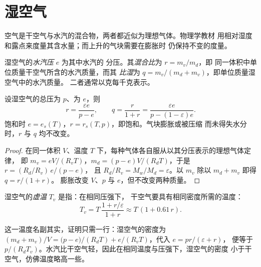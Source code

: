 \section{湿空气}\label{sec:b2:atmospheric-thermodynamics:moist-air}

空气是干空气与水汽的混合物，两者都近似为理想气体。物理学教材
用相对湿度和露点来度量其含水量；而上升的气块需要在膨胀时
仍保持不变的度量。

\begin{definition}\label{def:b2:atmospheric-thermodynamics:moist-air}
湿空气的\emph{水汽压} $e$ 为其中水汽的
分压。其\emph{混合比}为 $r = m_v/m_d$，即
同一体积中单位质量干空气所含的水汽质量，而其
\emph{比湿}为 $q = m_v/(m_d + m_v)$，即单位质量湿空气中的水汽质量。
二者通常以克每千克表示。
\end{definition}

\begin{proposition}[湿度变量]\label{prop:b2:atmospheric-thermodynamics:humidity}
设湿空气的总压为 $p$、为 $e$，则
\[
  r = \frac{\varepsilon e}{p - e}, \qquad q = \frac{r}{1 + r} = \frac{\varepsilon e}{p - (1 -
  \varepsilon)e} .
\]
饱和时 $e = e_s(T)$，$r = r_s(T, p)$，即饱和。气块膨胀或被压缩
而未得失水分时，$r$ 与 $q$ 均不改变。
\end{proposition}

\begin{proof}
在同一体积 $V$、温度 $T$ 下，每种气体各自服从以其分压表示的理想气体定律，
即 $m_v = eV/(R_vT)$，$m_d = (p - e)V/(R_dT)$，于是 $r = (R_d/R_v)\,e/(p - e)$，
且 $R_d/R_v = M_w/M_d = \varepsilon$。以 $m_v$ 除以 $m_d + m_v$ 即得 $q = r/(1 + r)$。
膨胀改变 $V$、$p$ 与 $e$，但不改变两种质量。
\end{proof}

\begin{definition}[虚温]\label{def:b2:atmospheric-thermodynamics:virtual}
湿空气的\emph{虚温} $T_v$ 是指：在相同压强下，
干空气要具有相同密度所需的温度：
\[
  T_v = T\,\frac{1 + r/\varepsilon}{1 + r} \approx T\,(1 + 0.61\,r) .
\]
\end{definition}

这一温度名副其实，证明只需一行：湿空气的密度为
$(m_d + m_v)/V = \bigl(p - e\bigr)/(R_dT) + e/(R_vT)$，代入 $e = pr/(\varepsilon + r)$，
便等于 $p/(R_dT_v)$。水汽比干空气轻，因此在相同温度与压强下，湿空气的密度
小于干空气，仿佛温度略高一些。


